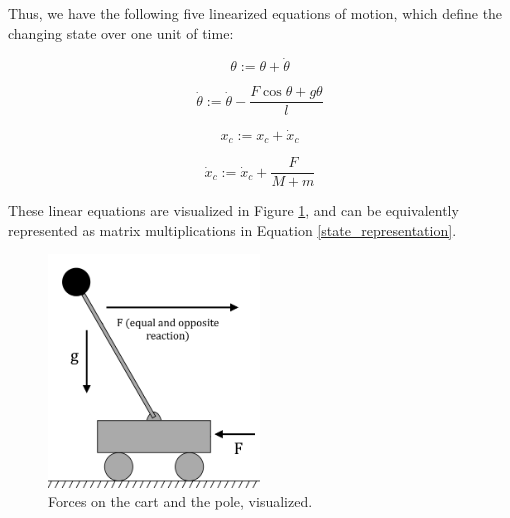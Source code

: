 \documentclass[11pt]{article}
\begin{document}
Thus, we have the following five linearized equations of motion, which define the changing state over one unit of time:

\begin{equation}
    \displaystyle \theta := \theta + \dot \theta
\end{equation}

\begin{equation}
    \displaystyle \dot \theta := \dot \theta - \frac{\displaystyle F \cos \theta + g \theta}{\displaystyle l}
\end{equation}

\begin{equation}
    \displaystyle x _c := x _c + \dot x _c
\end{equation}

\begin{equation}
    \dot x _c := \displaystyle \dot x _c + \frac{\displaystyle F}{\displaystyle M + m}
\end{equation}

These linear equations are visualized in Figure \ref{arrows}, and can be equivalently represented as matrix multiplications in Equation \ref{state_representation}.

\begin{figure}[ht]
    \centering
    \includegraphics[width=0.5\textwidth]{arrows}
    \caption{\label{arrows} Forces on the cart and the pole, visualized.}
\end{figure}
\end{document}
